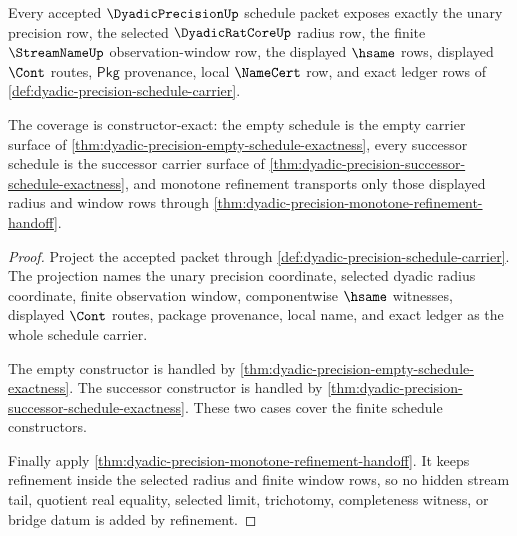 \begin{theorem}
\label{thm:dyadicprecision-radius-window-coverage}
Every accepted $\DyadicPrecisionUp$ schedule packet exposes exactly the unary
precision row, the selected $\DyadicRatCoreUp$ radius row, the finite
$\StreamNameUp$ observation-window row, the displayed $\hsame$ rows, displayed
$\Cont$ routes, $\mathsf{Pkg}$ provenance, local $\NameCert$ row, and exact
ledger rows of \autoref{def:dyadic-precision-schedule-carrier}.

The coverage is constructor-exact: the empty schedule is the empty carrier
surface of \autoref{thm:dyadic-precision-empty-schedule-exactness}, every
successor schedule is the successor carrier surface of
\autoref{thm:dyadic-precision-successor-schedule-exactness}, and monotone
refinement transports only those displayed radius and window rows through
\autoref{thm:dyadic-precision-monotone-refinement-handoff}.
\end{theorem}
\begin{proof}
Project the accepted packet through
\autoref{def:dyadic-precision-schedule-carrier}. The projection names the unary
precision coordinate, selected dyadic radius coordinate, finite observation
window, componentwise $\hsame$ witnesses, displayed $\Cont$ routes, package
provenance, local name, and exact ledger as the whole schedule carrier.

The empty constructor is handled by
\autoref{thm:dyadic-precision-empty-schedule-exactness}. The successor
constructor is handled by
\autoref{thm:dyadic-precision-successor-schedule-exactness}. These two cases
cover the finite schedule constructors.

Finally apply \autoref{thm:dyadic-precision-monotone-refinement-handoff}. It
keeps refinement inside the selected radius and finite window rows, so no
hidden stream tail, quotient real equality, selected limit, trichotomy,
completeness witness, or bridge datum is added by refinement.
\end{proof}

